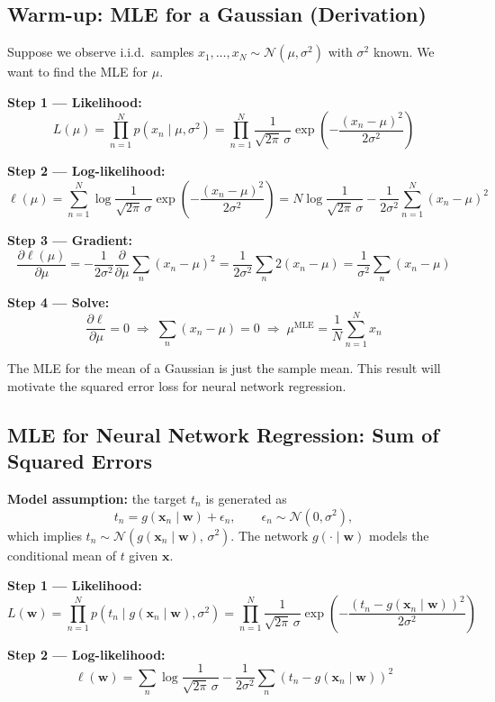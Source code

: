 \documentclass[11pt,a4paper]{article}
\begin{document}
\subsection{Warm-up: MLE for a Gaussian (Derivation)}

Suppose we observe i.i.d.\ samples $x_1, \ldots, x_N \sim \mathcal{N}(\mu, \sigma^2)$ with $\sigma^2$ known. We want to find the MLE for $\mu$.

\textbf{Step 1 — Likelihood:}
\[
L(\mu) = \prod_{n=1}^N p(x_n \mid \mu, \sigma^2) = \prod_{n=1}^N \frac{1}{\sqrt{2\pi}\,\sigma} \exp\!\left(-\frac{(x_n-\mu)^2}{2\sigma^2}\right)
\]

\textbf{Step 2 — Log-likelihood:}
\[
\ell(\mu) = \sum_{n=1}^N \log \frac{1}{\sqrt{2\pi}\,\sigma} \exp\!\left(-\frac{(x_n-\mu)^2}{2\sigma^2}\right)
= N \log\frac{1}{\sqrt{2\pi}\,\sigma} - \frac{1}{2\sigma^2}\sum_{n=1}^N (x_n - \mu)^2
\]

\textbf{Step 3 — Gradient:}
\[
\frac{\partial \ell(\mu)}{\partial \mu} = -\frac{1}{2\sigma^2}\frac{\partial}{\partial \mu}\sum_n(x_n - \mu)^2 = \frac{1}{2\sigma^2}\sum_n 2(x_n - \mu) = \frac{1}{\sigma^2}\sum_n (x_n - \mu)
\]

\textbf{Step 4 — Solve:}
\[
\frac{\partial \ell}{\partial \mu} = 0 \;\Rightarrow\; \sum_n (x_n - \mu) = 0 \;\Rightarrow\; \mu^{\mathrm{MLE}} = \frac{1}{N}\sum_{n=1}^N x_n
\]

The MLE for the mean of a Gaussian is just the sample mean. This result will motivate the squared error loss for neural network regression.

\subsection{MLE for Neural Network Regression: Sum of Squared Errors}

\textbf{Model assumption:} the target $t_n$ is generated as
\[
t_n = g(\mathbf{x}_n \mid \mathbf{w}) + \epsilon_n, \qquad \epsilon_n \sim \mathcal{N}(0, \sigma^2),
\]
which implies $t_n \sim \mathcal{N}(g(\mathbf{x}_n \mid \mathbf{w}),\, \sigma^2)$. The network $g(\cdot \mid \mathbf{w})$ models the conditional mean of $t$ given $\mathbf{x}$.

\textbf{Step 1 — Likelihood:}
\[
L(\mathbf{w}) = \prod_{n=1}^N p(t_n \mid g(\mathbf{x}_n \mid \mathbf{w}), \sigma^2)
= \prod_{n=1}^N \frac{1}{\sqrt{2\pi}\,\sigma}\exp\!\left(-\frac{(t_n - g(\mathbf{x}_n \mid \mathbf{w}))^2}{2\sigma^2}\right)
\]

\textbf{Step 2 — Log-likelihood:}
\[
\ell(\mathbf{w}) = \sum_n \log\frac{1}{\sqrt{2\pi}\,\sigma} - \frac{1}{2\sigma^2}\sum_n (t_n - g(\mathbf{x}_n \mid \mathbf{w}))^2
\]
\end{document}
